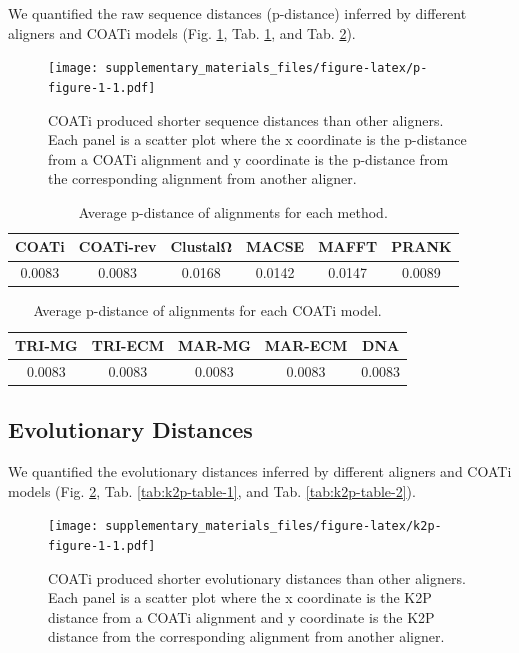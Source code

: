 \documentclass[
]{article}
\begin{document}
We quantified the raw sequence distances (p-distance) inferred by different
aligners and COATi models (Fig. \ref{fig:p-figure-1},
Tab. \ref{tab:p-table-1}, and Tab. \ref{tab:p-table-2}).

\begin{figure}
\centering
\texttt{[image: supplementary\_materials\_files/figure-latex/p-figure-1-1.pdf]}
\caption{\label{fig:p-figure-1}COATi produced shorter sequence distances than other aligners. Each panel is a scatter plot where the x coordinate is the p-distance from a COATi alignment and y coordinate is the p-distance from the corresponding alignment from another aligner.}
\end{figure}

\begin{table}[H]
\centering
\caption{\label{tab:p-table-1}Average p-distance of alignments for each method.}
\centering
\begin{tabular}[t]{cccccc}
\toprule
COATi & COATi-rev & ClustalΩ & MACSE & MAFFT & PRANK\\
\midrule
0.0083 & 0.0083 & 0.0168 & 0.0142 & 0.0147 & 0.0089\\
\bottomrule
\end{tabular}
\end{table}

\begin{table}[H]
\centering
\caption{\label{tab:p-table-2}Average p-distance of alignments for each COATi model.}
\centering
\begin{tabular}[t]{ccccc}
\toprule
TRI-MG & TRI-ECM & MAR-MG & MAR-ECM & DNA\\
\midrule
0.0083 & 0.0083 & 0.0083 & 0.0083 & 0.0083\\
\bottomrule
\end{tabular}
\end{table}

\newpage

\subsection{Evolutionary Distances}\label{evolutionary-distances}

We quantified the evolutionary distances inferred by different aligners and
COATi models (Fig. \ref{fig:k2p-figure-1}, Tab. \ref{tab:k2p-table-1}, and
Tab. \ref{tab:k2p-table-2}).

\begin{figure}
\centering
\texttt{[image: supplementary\_materials\_files/figure-latex/k2p-figure-1-1.pdf]}
\caption{\label{fig:k2p-figure-1}COATi produced shorter evolutionary distances than other aligners. Each panel is a scatter plot where the x coordinate is the K2P distance from a COATi alignment and y coordinate is the K2P distance from the corresponding alignment from another aligner.}
\end{figure}
\end{document}
